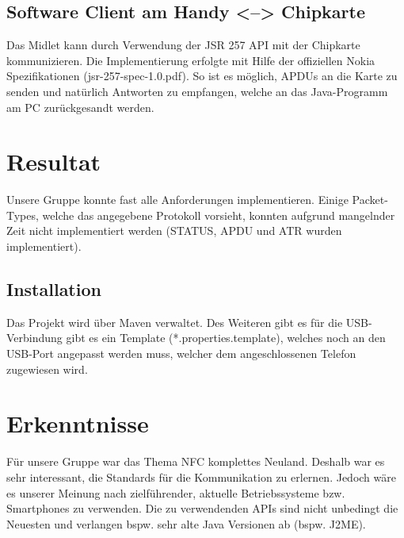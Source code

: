 \documentclass[paper=a4, fontsize=11pt]{scrartcl}
\begin{document}
\subsection{Software Client am Handy <--> Chipkarte}
Das Midlet kann durch Verwendung der JSR 257 API mit der Chipkarte kommunizieren. Die Implementierung erfolgte mit Hilfe der offiziellen Nokia Spezifikationen (jsr-257-spec-1.0.pdf). So ist es möglich, APDUs an die Karte zu senden und natürlich Antworten zu empfangen, welche an das Java-Programm am PC zurückgesandt werden.

\section{Resultat}
Unsere Gruppe konnte fast alle Anforderungen implementieren. Einige Packet-Types, welche das angegebene Protokoll vorsieht, konnten aufgrund mangelnder Zeit nicht implementiert werden (STATUS, APDU und ATR wurden implementiert).
\subsection{Installation}
Das Projekt wird über Maven verwaltet. Des Weiteren gibt es für die USB-Verbindung gibt es ein Template (*.properties.template), welches noch an den USB-Port angepasst werden muss, welcher dem angeschlossenen Telefon zugewiesen wird.

\section{Erkenntnisse}
Für unsere Gruppe war das Thema NFC komplettes Neuland. Deshalb war es sehr interessant, die Standards für die Kommunikation zu erlernen. Jedoch wäre es unserer Meinung nach zielführender, aktuelle Betriebssysteme bzw. Smartphones zu verwenden. Die zu verwendenden APIs sind nicht unbedingt die Neuesten und verlangen bspw. sehr alte Java Versionen ab (bspw. J2ME).
\end{document}
